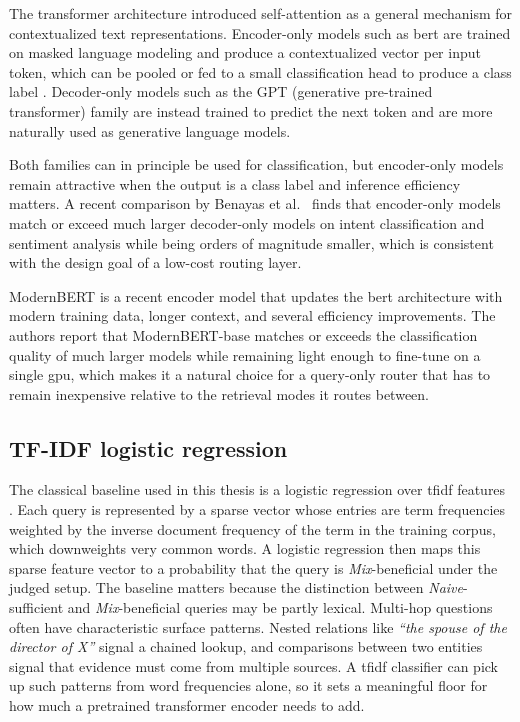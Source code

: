 \documentclass[english, bibtex]{kththesis}               %
\numberwithin{listing}{chapter}
\begin{document}
The transformer architecture \cite{vaswani2017attention} introduced self-attention as a general mechanism for contextualized text representations. Encoder-only models such as \gls{bert} are trained on masked language modeling and produce a contextualized vector per input token, which can be pooled or fed to a small classification head to produce a class label \cite{devlin2019bert}. Decoder-only models such as the GPT (generative pre-trained transformer) family are instead trained to predict the next token and are more naturally used as generative language models.

Both families can in principle be used for classification, but encoder-only models remain attractive when the output is a class label and inference efficiency matters. A recent comparison by Benayas et al.\ \cite{benayas2024encoder} finds that encoder-only models match or exceed much larger decoder-only models on intent classification and sentiment analysis while being orders of magnitude smaller, which is consistent with the design goal of a low-cost routing layer.

ModernBERT \cite{warner2024modernbert} is a recent encoder model that updates the \gls{bert} architecture with modern training data, longer context, and several efficiency improvements. The authors report that ModernBERT-base matches or exceeds the classification quality of much larger models while remaining light enough to fine-tune on a single \gls{gpu}, which makes it a natural choice for a query-only router that has to remain inexpensive relative to the retrieval modes it routes between.

\subsection{TF-IDF logistic regression}
\label{sec:backgroundTfidf}

The classical baseline used in this thesis is a logistic regression over \gls{tfidf} features \cite{salton1988termweighting}. Each query is represented by a sparse vector whose entries are term frequencies weighted by the inverse document frequency of the term in the training corpus, which downweights very common words. A logistic regression then maps this sparse feature vector to a probability that the query is \emph{Mix}-beneficial under the judged setup. The baseline matters because the distinction between \emph{Naive}-sufficient and \emph{Mix}-beneficial queries may be partly lexical. Multi-hop questions often have characteristic surface patterns. Nested relations like \emph{``the spouse of the director of X''} signal a chained lookup, and comparisons between two entities signal that evidence must come from multiple sources. A \gls{tfidf} classifier can pick up such patterns from word frequencies alone, so it sets a meaningful floor for how much a pretrained transformer encoder needs to add.
\end{document}
